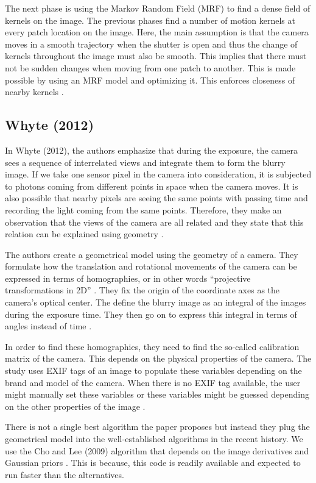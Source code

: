 \documentclass[10pt,twocolumn,letterpaper]{article}
\begin{document}
The next phase is using the Markov Random Field (MRF) to find a dense field of kernels on the image. The previous phases find a number of motion kernels at every patch location on the image. Here, the main assumption is that the camera moves in a smooth trajectory when the shutter is open and thus the change of kernels throughout the image must also be smooth. This implies that there must not be sudden changes when moving from one patch to another. This is made possible by using an MRF model and optimizing it. This enforces closeness of nearby kernels \cite{sun2015learning}.

\subsection{Whyte \textbf{\etal} (2012)}

In Whyte \etal (2012), the authors emphasize that during the exposure, the camera sees a sequence of interrelated views and integrate them to form the blurry image. If we take one sensor pixel in the camera into consideration, it is subjected to photons coming from different points in space when the camera moves. It is also possible that nearby pixels are seeing the same points with passing time and recording the light coming from the same points. Therefore, they make an observation that the views of the camera are all related and they state that this relation can be explained using geometry \cite{whyte2012non}.

The authors create a geometrical model using the geometry of a camera. They formulate how the translation and rotational movements of the camera can be expressed in terms of homographies, or in other words ``projective transformations in 2D'' \cite{whyte2012non}. They fix the origin of the coordinate axes as the camera's optical center. The define the blurry image as an integral of the images during the exposure time. They then go on to express this integral in terms of angles instead of time \cite{whyte2012non}. 

In order to find these homographies, they need to find the so-called calibration matrix of the camera. This depends on the physical properties of the camera. The study uses EXIF tags of an image to populate these variables depending on the brand and model of the camera. When there is no EXIF tag available, the user might manually set these variables or these variables might be guessed depending on the other properties of the image \cite{whyte2012non}.

There is not a single best algorithm the paper proposes but instead they plug the geometrical model into the well-established algorithms in the recent history. We use the Cho and Lee (2009) algorithm that depends on the image derivatives and Gaussian priors \cite{cho2009fast}. This is because, this code is readily available and expected to run faster than the alternatives.
\end{document}
